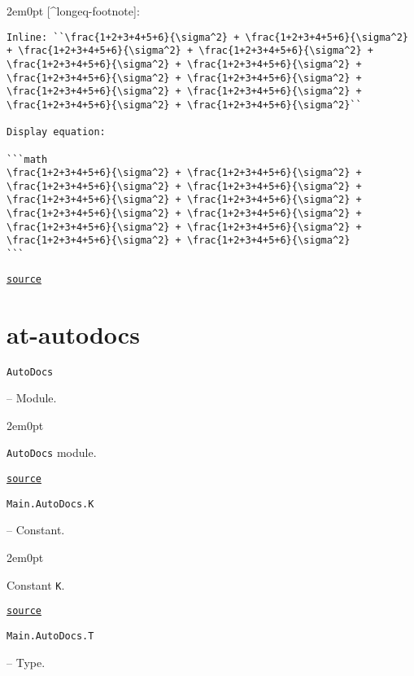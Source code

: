 \begin{adjustwidth}{2em}{0pt}
[{\textasciicircum}longeq-footnote]:


\begin{lstlisting}
Inline: ``\frac{1+2+3+4+5+6}{\sigma^2} + \frac{1+2+3+4+5+6}{\sigma^2} + \frac{1+2+3+4+5+6}{\sigma^2} + \frac{1+2+3+4+5+6}{\sigma^2} + \frac{1+2+3+4+5+6}{\sigma^2} + \frac{1+2+3+4+5+6}{\sigma^2} + \frac{1+2+3+4+5+6}{\sigma^2} + \frac{1+2+3+4+5+6}{\sigma^2} + \frac{1+2+3+4+5+6}{\sigma^2} + \frac{1+2+3+4+5+6}{\sigma^2} + \frac{1+2+3+4+5+6}{\sigma^2} + \frac{1+2+3+4+5+6}{\sigma^2}``

Display equation:

```math
\frac{1+2+3+4+5+6}{\sigma^2} + \frac{1+2+3+4+5+6}{\sigma^2} + \frac{1+2+3+4+5+6}{\sigma^2} + \frac{1+2+3+4+5+6}{\sigma^2} + \frac{1+2+3+4+5+6}{\sigma^2} + \frac{1+2+3+4+5+6}{\sigma^2} + \frac{1+2+3+4+5+6}{\sigma^2} + \frac{1+2+3+4+5+6}{\sigma^2} + \frac{1+2+3+4+5+6}{\sigma^2} + \frac{1+2+3+4+5+6}{\sigma^2} + \frac{1+2+3+4+5+6}{\sigma^2} + \frac{1+2+3+4+5+6}{\sigma^2}
```
\end{lstlisting}



\href{https://example.org/Repository.jl/blob/test/examples/make.jl#L41-71}{\texttt{source}}


\end{adjustwidth}

\section{at-autodocs}



\label{17848419264812669351}{}

\hypertarget{11302554442225637105}{\texttt{AutoDocs}}  -- {Module.}

\begin{adjustwidth}{2em}{0pt}

\texttt{AutoDocs} module.



\href{https://example.org/Repository.jl/blob/test/examples/make.jl#L75-75}{\texttt{source}}


\end{adjustwidth}
\hypertarget{15441025252371609530}{\texttt{Main.AutoDocs.K}}  -- {Constant.}

\begin{adjustwidth}{2em}{0pt}

Constant \texttt{K}.



\href{https://example.org/Repository.jl/blob/test/examples/make.jl#L88-88}{\texttt{source}}


\end{adjustwidth}
\hypertarget{12338358314596597808}{\texttt{Main.AutoDocs.T}}  -- {Type.}

